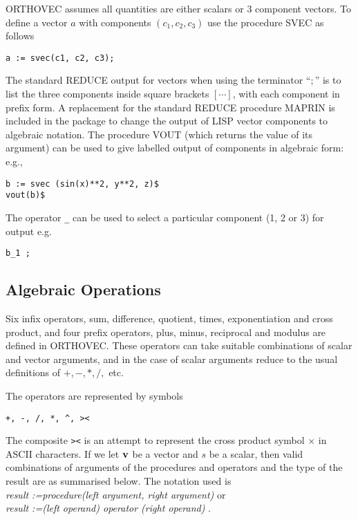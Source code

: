 ORTHOVEC assumes all quantities are either scalars or 3 component
vectors.  To define a vector $a$ with components $(c_1, c_2, c_3)$ use
the procedure SVEC as follows 
\begin{verbatim}
a := svec(c1, c2, c3);
\end{verbatim}

The standard REDUCE output for vectors when using the terminator ``$;$''
is to list the three components inside square brackets
$[\cdots]$, with each component in prefix form.  A replacement for the
standard REDUCE procedure MAPRIN is included in
the package to change the 
output of LISP vector components to algebraic notation.  The procedure
 VOUT (which returns the value of its argument)
can be used to give labelled output of components 
in algebraic form: e.g.,
\begin{verbatim}
b := svec (sin(x)**2, y**2, z)$
vout(b)$
\end{verbatim}

The operator {\tt \_} can be used to select a particular 
component (1, 2 or 3) for output e.g.
\begin{verbatim}
b_1 ;
\end{verbatim}

\subsection{Algebraic Operations}

Six infix operators, sum, difference, quotient, times, exponentiation
and cross product, and four prefix
operators, plus, minus, reciprocal
and  modulus are defined in ORTHOVEC.  These operators can take suitable
combinations of scalar and vector arguments,
and in the case of scalar arguments reduce to the usual definitions of
$ +, -, *, /, $ etc.

The operators are represented by symbols 
  
  
\begin{verbatim}  
+, -, /, *, ^, ><
\end{verbatim}

 The composite {\tt ><} is an
attempt to represent the cross product symbol 
$\times$ in ASCII characters.
If we let ${\bf v}$ be a vector and $s$ be a scalar, then
valid combinations of arguments of the 
procedures and operators and the type of the result 
are as summarised below.  The notation used is\\
{\em result :=procedure(left argument, right argument) } or\\
{\em result :=(left operand) operator (right operand) } . \\

